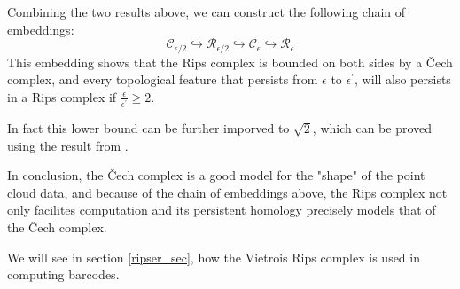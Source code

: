 \documentclass[11pt,a4paper]{report}
\begin{document}
            Combining the two results above, we can construct the following chain of embeddings:
            \[
             \mathcal{C}_{\epsilon/2} \hookrightarrow \mathcal{R}_{\epsilon/2} \hookrightarrow \mathcal{C}_\epsilon \hookrightarrow \mathcal{R}_{\epsilon}
            \]
            This embedding shows that the Rips complex is bounded on both sides by a \v{C}ech complex, and every topological feature that persists from $\epsilon$ to $\epsilon^\prime$, will also persists in a Rips complex if  $\frac{\epsilon}{\epsilon^\prime} \geq 2$. 
            
            In fact this lower bound can be further imporved to $\sqrt{2}$, which can be proved using the result from \cite{Silva_Ghrist_2007}. 
            
            In conclusion, the \v{C}ech complex is a good model for the "shape" of the point cloud data, 
            and because of the chain of embeddings above, the Rips complex not only facilites computation and its persistent homology precisely models that of the \v{C}ech complex.
            
            We will see in section \ref{ripser_sec}, how the Vietrois Rips complex is used in computing barcodes. 

              


    
\end{document}
